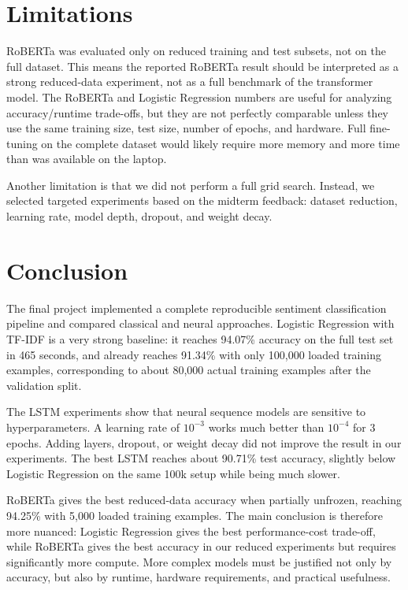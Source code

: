 \documentclass[conference]{IEEEtran}
\begin{document}
\section{Limitations}
RoBERTa was evaluated only on reduced training and test subsets, not on the full
dataset. This means the reported RoBERTa result should be interpreted as a
strong reduced-data experiment, not as a full benchmark of the transformer
model. The RoBERTa and Logistic Regression numbers are useful for analyzing
accuracy/runtime trade-offs, but they are not perfectly comparable unless they
use the same training size, test size, number of epochs, and hardware. Full
fine-tuning on the complete dataset would likely require more memory and more
time than was available on the laptop.

Another limitation is that we did not perform a full grid search. Instead, we
selected targeted experiments based on the midterm feedback: dataset reduction,
learning rate, model depth, dropout, and weight decay.

\section{Conclusion}
The final project implemented a complete reproducible sentiment classification
pipeline and compared classical and neural approaches. Logistic Regression with
TF-IDF is a very strong baseline: it reaches 94.07\% accuracy on the full test
set in 465 seconds, and already reaches 91.34\% with only 100,000 loaded
training examples, corresponding to about 80,000 actual training examples after
the validation split.

The LSTM experiments show that neural sequence models are sensitive to
hyperparameters. A learning rate of $10^{-3}$ works much better than
$10^{-4}$ for 3 epochs. Adding layers, dropout, or weight decay did not improve
the result in our experiments. The best LSTM reaches about 90.71\% test
accuracy, slightly below Logistic Regression on the same 100k setup while being
much slower.

RoBERTa gives the best reduced-data accuracy when partially unfrozen, reaching
94.25\% with 5,000 loaded training examples. The main conclusion is therefore
more nuanced: Logistic Regression gives the best performance-cost trade-off,
while RoBERTa gives the best accuracy in our reduced experiments but requires
significantly more compute. More complex models must be justified not only by
accuracy, but also by runtime, hardware requirements, and practical usefulness.
\end{document}
